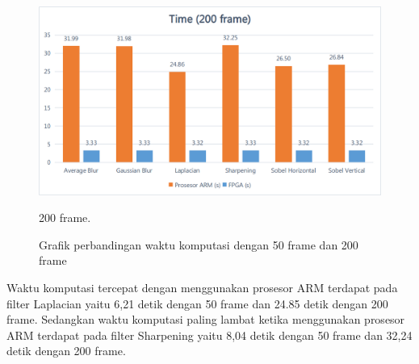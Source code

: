 \begin{figure}[H]
    \centering
    \includegraphics[width=0.81\linewidth, center]{images/chart/chart-time200.png}
    \caption{200 frame.}
    \label{fig:chart-time200}
    \caption{Grafik perbandingan waktu komputasi dengan 50 frame dan 200 frame}
\end{figure}


Waktu komputasi tercepat dengan menggunakan prosesor ARM terdapat pada filter Laplacian yaitu 6,21 detik dengan 50 frame dan 24.85 detik dengan 200 frame. Sedangkan waktu komputasi paling lambat ketika menggunakan prosesor ARM terdapat pada filter Sharpening yaitu 8,04 detik dengan 50 frame dan 32,24 detik dengan 200 frame. 


